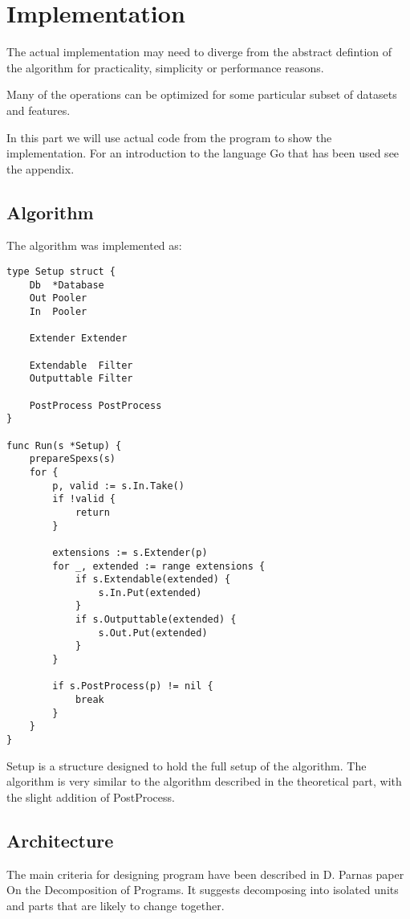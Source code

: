 \chapter{Implementation}

The actual implementation may need to diverge from the abstract
defintion of the algorithm for practicality, simplicity or
performance reasons.

Many of the operations can be optimized for some particular
subset of datasets and features.

In this part we will use actual code from the program to show 
the implementation. For an introduction to the language 
Go that has been used see the appendix.

\section{Algorithm}

The algorithm was implemented as:

\begin{verbatim}
type Setup struct {
	Db  *Database
	Out Pooler
	In  Pooler

	Extender Extender

	Extendable  Filter
	Outputtable Filter

	PostProcess PostProcess
}

func Run(s *Setup) {
	prepareSpexs(s)
	for {
		p, valid := s.In.Take()
		if !valid {
			return
		}

		extensions := s.Extender(p)
		for _, extended := range extensions {
			if s.Extendable(extended) {
				s.In.Put(extended)
			}
			if s.Outputtable(extended) {
				s.Out.Put(extended)
			}
		}

		if s.PostProcess(p) != nil {
			break
		}
	}
}
\end{verbatim}

Setup is a structure designed to hold the full setup of the algorithm.
The algorithm is very similar to the algorithm described in the theoretical
part, with the slight addition of PostProcess.

\section{Architecture}

The main criteria for designing program have been described in D. Parnas
paper On the Decomposition of Programs. It suggests decomposing into
isolated units and parts that are likely to change together.

